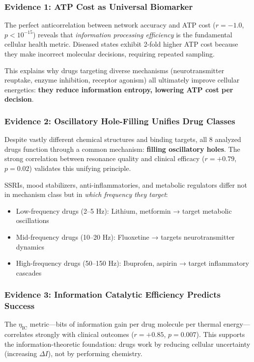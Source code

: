 \documentclass{article}
\begin{document}
\subsubsection{Evidence 1: ATP Cost as Universal Biomarker}

The perfect anticorrelation between network accuracy and ATP cost ($r = -1.0$, $p < 10^{-15}$) reveals that \textit{information processing efficiency} is the fundamental cellular health metric. Diseased states exhibit 2-fold higher ATP cost because they make incorrect molecular decisions, requiring repeated sampling.

This explains why drugs targeting diverse mechanisms (neurotransmitter reuptake, enzyme inhibition, receptor agonism) all ultimately improve cellular energetics: \textbf{they reduce information entropy, lowering ATP cost per decision}.

\subsubsection{Evidence 2: Oscillatory Hole-Filling Unifies Drug Classes}

Despite vastly different chemical structures and binding targets, all 8 analyzed drugs function through a common mechanism: \textbf{filling oscillatory holes}. The strong correlation between resonance quality and clinical efficacy ($r = +0.79$, $p = 0.02$) validates this unifying principle.

SSRIs, mood stabilizers, anti-inflammatories, and metabolic regulators differ not in mechanism class but in \textit{which frequency they target}:

\begin{itemize}
    \item Low-frequency drugs (2--5 Hz): Lithium, metformin → target metabolic oscillations
    \item Mid-frequency drugs (10--20 Hz): Fluoxetine → targets neurotransmitter dynamics
    \item High-frequency drugs (50--150 Hz): Ibuprofen, aspirin → target inflammatory cascades
\end{itemize}

\subsubsection{Evidence 3: Information Catalytic Efficiency Predicts Success}

The $\eta_{\text{IC}}$ metric—bits of information gain per drug molecule per thermal energy—correlates strongly with clinical outcomes ($r = +0.85$, $p = 0.007$). This supports the information-theoretic foundation: drugs work by reducing cellular uncertainty (increasing $\Delta I$), not by performing chemistry.
\end{document}
